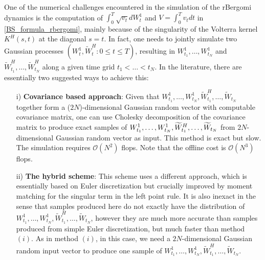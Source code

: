 \documentclass[11pt]{article}
\newcommand{\Ordo}[1]{{\mathcal{O}}\left(#1\right)}
\begin{document}
One of the numerical challenges encountered in the simulation of the rBergomi dynamics  is the computation of  $\int_{0}^{T} \sqrt{v_t} dW_t^1$ and $V=\int_{0}^{T} v_t dt$ in \eqref{BS_formula_rbergomi}, mainly because of the singularity of the Volterra kernel $K^H(s,t)$ at the diagonal $s = t$. In fact,  one needs to jointly simulate two Gaussian processes $(W_t^1, \widetilde{W}^H_t: 0 \le t \le T)$, resulting in $W^1_{t_1},\dots, W^1_{t_N}$ and $\widetilde{W}^H_{t_1},\dots, \widetilde{W}^H_{t_N}$ along a given time grid $t_1 <\dots < t_N$. In the literature, there are essentially two suggested ways to achieve this:
 \begin{enumerate}
 	
 	\item[i)] \textbf{Covariance based approach}: Given that $W^1_{t_1},\dots, W^1_{t_N}, \widetilde{W}^H_{t_1},\dots, \widetilde{W}_{t_N}$ together form a ($2N$)-dimensional Gaussian random vector with computable covariance matrix, one can use Cholesky decomposition of the covariance matrix to produce exact samples of $W^1_{t_1},\dots, W^1_{t_N}, \linebreak \widetilde{W}^H_{t_1},\dots, \widetilde{W}_{t_N}$ from $2 N$-dimensional Gaussian random vector as  input. This method is exact but slow. The simulation  requires $\Ordo{N^2}$ flops. Note that the offline cost is $\Ordo{N^3}$ flops.
 	
 	\item[ii)]  \textbf{The hybrid scheme}: This scheme uses a different approach, which is essentially based on  Euler discretization  but crucially improved by moment
 	matching for the singular term in the left point rule. It is also
 	inexact in the sense that samples produced here do not exactly have the distribution of $W^1_{t_1},\dots, W^1_{t_N}, \widetilde{W}^H_{t_1},\dots, \widetilde{W}_{t_N}$, however they are much more accurate than samples produced from simple Euler discretization, but much faster than method $(i)$. As in method $(i)$, in this case, we need a $2 N$-dimensional Gaussian random input vector to produce one 	sample of $W^1_{t_1},\dots, W^1_{t_N}, \widetilde{W}^H_{t_1},\dots, \widetilde{W}_{t_N}$.
 \end{enumerate}
\end{document}
